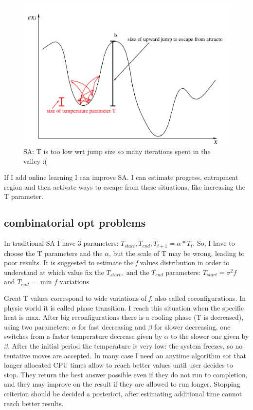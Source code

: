 \documentclass[10pt]{article}
\begin{document}
\begin{figure}[H]
\includegraphics[scale=0.40]{sa}
\caption{SA: T is too low wrt jump size so many iterations spent in the valley :( }
\centering
\end{figure}

If I add online learning I can improve SA. I can estimate progress, entrapment region and then activate ways to escape from these situations, like increasing the T parameter.

\subsection{combinatorial opt problems}
In traditional SA I have 3 parameters: $ T_{start}, T_{end}, T_{t+1} = \alpha * T_t $. So, I have to choose the T parameters and the $ \alpha $, but the scale of T may be wrong, leading to poor results. It is suggested to estimate the \textit{f} values distribution in order to understand at which value fix the $ T_{start}, \text{ and the } T_{end} $ parameters: $ T_{start} = \sigma^2 f $ and $ T_{end} = \text{ min } f \text{ variations} $

Great T values correspond to wide variations of \textit{f}, also called reconfigurations. In physic world it is called phase transition. I reach this situation when the specific heat is max. After big reconfigurations there is a cooling phase (T is decreased), using two parameters: $ \alpha $ for fast decreasing and $ \beta $ for slower decreasing. one switches from a faster temperature decrease given by $ \alpha $ to the slower one given by $ \beta $.
After the initial period the temperature is very low: the system freezes, so no tentative moves are accepted. In many case I need an anytime algorithm sot that longer allocated CPU times allow to reach better values until user decides to stop. They return the best answer possible even if they do not run to completion, and they may improve on the result if they are allowed to run longer. Stopping criterion should be decided a posteriori, after estimating additional time cannot reach better results. 
\end{document}
